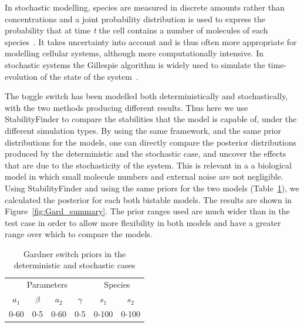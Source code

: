 In stochastic modelling, species are measured in discrete amounts rather than concentrations and a joint probability distribution is used to express the probability that at time \textit{t} the cell contains a number of molecules of each species~\autocite{deJong:2002ft}. It takes uncertainty into account and is thus often more appropriate for modelling cellular systems, although more computationally intensive. In stochastic systems the Gillespie algorithm is widely used to simulate the time-evolution of the state of the system~\autocite{Warren:2005kea}.

The toggle switch has been modelled both deterministically and stochastically, with the two methods producing different results. Thus here we use StabilityFinder to compare the stabilities that the model is capable of, under the different simulation types. By using the same framework, and the same prior distributions for the models, one can directly compare the posterior distributions produced by the deterministic and the stochastic case, and uncover the effects that are due to the stochasticity of the system. This is relevant in a a biological model in which small molecule numbers and external noise are not negligible. Using StabilityFinder and using the same priors for the two models (Table~\ref{tab:gard_det_stoch}), we calculated the posterior for each both bistable models. The results are shown in Figure~\ref{fig:Gard_summary}. The prior ranges used are much wider than in the test case in order to allow more flexibility in both models and have a greater range over which to compare the models. 


\begin{table}[h]
\centering
\caption{Gardner switch priors in the deterministic and stochastic cases}
\label{tab:gard_det_stoch}
\begin{tabular}{cccc|cc}
\multicolumn{4}{c|}{Parameters} & \multicolumn{2}{c}{Species} \\ %
$a_1$   & $\beta$   & $a_2$   & $\gamma$  &   $s_1$      &       $s_2$   \\
0-60    & 0-5       & 0-60    &  0-5      &      0-100   &          0-100   
\end{tabular}
\end{table}

